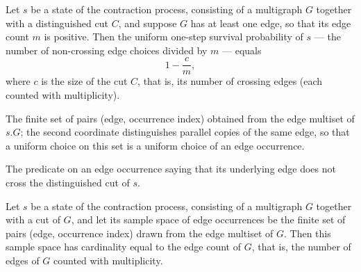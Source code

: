 \begin{lemma}
\label{KargerTrace.uniformSurvivalProb_eq_survivalProb}
\leanok
{}
Let $s$ be a state of the contraction process, consisting of a multigraph $G$ together
with a distinguished cut $C$, and suppose $G$ has at least one edge, so that its edge
count $m$ is positive. Then the uniform one-step survival probability of $s$ — the
number of non-crossing edge choices divided by $m$ — equals
\[
  1 - \frac{c}{m},
\]
where $c$ is the size of the cut $C$, that is, its number of crossing edges (each
counted with multiplicity).
\end{lemma}

\begin{definition}
\label{KargerTrace.edgeChoiceSpace}
\leanok
{}
The finite set of pairs (edge, occurrence index) obtained from the edge multiset of $s.G$;
the second coordinate distinguishes parallel copies of the same edge, so that a uniform
choice on this set is a uniform choice of an edge occurrence.
\end{definition}

\begin{definition}
\label{KargerTrace.edgeChoiceSurvives}
\leanok
{}
The predicate on an edge occurrence saying that its underlying edge does not cross the
distinguished cut of $s$.
\end{definition}

\begin{lemma}
\label{KargerTrace.edgeChoiceSpace_card}
\leanok
{}
Let $s$ be a state of the contraction process, consisting of a multigraph $G$ together
with a cut of $G$, and let its sample space of edge occurrences be the finite set of
pairs (edge, occurrence index) drawn from the edge multiset of $G$. Then this sample
space has cardinality equal to the edge count of $G$, that is, the number of edges of
$G$ counted with multiplicity.
\end{lemma}

